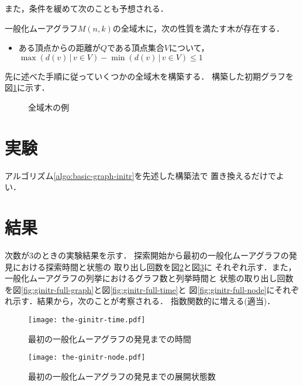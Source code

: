 また，条件を緩めて次のことも予想される．
\begin{conjecture}
  \label{conj:spanning-tree-2}
  一般化ムーアグラフ$M(n,k)$の全域木に，次の性質を満たす木が存在する．
  \begin{itemize}
  \item ある頂点からの距離が$Q$である頂点集合$V$について，
    $\max(d(v)\,|\,v\in V)-\min(d(v)\,|\,v\in V)\leq 1$
  \end{itemize}
\end{conjecture}

\begin{example}
  先に述べた手順に従っていくつかの全域木を構築する．
  構築した初期グラフを図\ref{fig:initial-spanning-tree-example}に示す．
  \begin{figure}
    \centering
    \hfill
    \caption{全域木の例}
    \label{fig:initial-spanning-tree-example}
  \end{figure}
\end{example}

\section{実験}
\label{sect:exp-reduce-by-initial}
アルゴリズム\ref{algo:basic-graph-initr}を先述した構築法で
置き換えるだけでよい．

\section{結果}
\label{sect:result-reduce-by-initial}
次数が3のときの実験結果を示す．
探索開始から最初の一般化ムーアグラフの発見における探索時間と状態の
取り出し回数を図\ref{fig:ginitr-time}と図\ref{fig:ginitr-node}に
それぞれ示す．また，一般化ムーアグラフの列挙におけるグラフ数と列挙時間と
状態の取り出し回数を図\ref{fig:ginitr-full-graph}と図\ref{fig:ginitr-full-time}と
図\ref{fig:ginitr-full-node}にそれぞれ示す．結果から，次のことが考察される．
指数関数的に増える(適当)．

\begin{figure}
  \centering
  \texttt{[image: the-ginitr-time.pdf]}
  \caption{最初の一般化ムーアグラフの発見までの時間}
  \label{fig:ginitr-time}
\end{figure}
\begin{figure}
  \centering
  \texttt{[image: the-ginitr-node.pdf]}
  \caption{最初の一般化ムーアグラフの発見までの展開状態数}
  \label{fig:ginitr-node}
\end{figure}

